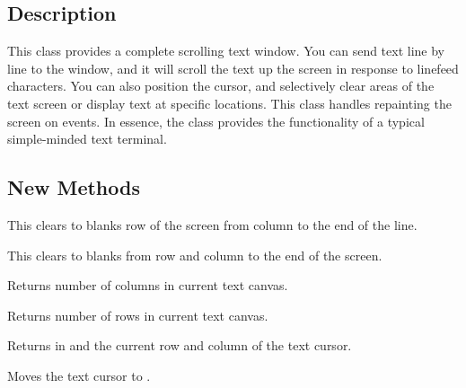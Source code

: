 \subsection* {Description}

This class provides a complete scrolling text window. You
can send text line by line to the window, and it will scroll the
text up the screen in response to linefeed characters. You can
also position the cursor, and selectively clear areas of the text
screen or display text at specific locations. This class handles
repainting the screen on  events. In essence, the
 class provides the functionality of a
typical simple-minded text terminal.

\subsection* {New Methods}


This clears to blanks row  of the screen from
column  to the end of the line.


This clears to blanks from row  and column 
to the end of the screen.


Returns number of columns in current text canvas.


Returns number of rows in current text canvas.


Returns in  and  the current row and
column of the text cursor.


Moves the text cursor to .


